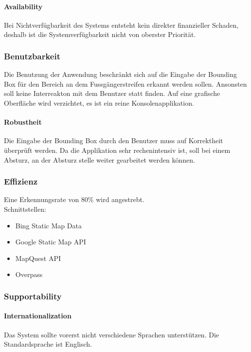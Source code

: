 \paragraph{Availability}
Bei Nichtverfügbarkeit des Systems entsteht kein direkter finanzieller Schaden, deshalb ist die Systemverfügbarkeit nicht von oberster Priorität. 
\subsubsection{Benutzbarkeit}
Die Benutzung der Anwendung beschränkt sich auf die Eingabe der Bounding Box für den Bereich an dem Fussgängerstreifen erkannt werden sollen. Ansonsten soll keine Interreakton mit dem Benutzer statt finden. Auf eine grafische Oberfläche wird verzichtet, es ist ein reine Konsolenapplikation.

\paragraph{Robustheit}
Die Eingabe der Bounding Box durch den Benutzer muss auf Korrektheit überprüft werden. Da die Applikation sehr rechenintensiv ist, soll bei einem Absturz, an der Absturz stelle weiter gearbeitet werden können.
\subsubsection{Effizienz}
Eine Erkennungsrate von 80\% wird angestrebt.\\
Schnittstellen:
\begin{itemize}
	\item Bing Static Map Data
	\item Google Static Map API
	\item MapQuest API
	\item Overpass
\end{itemize}

\subsubsection{Supportability}
\paragraph{Internationalization}
Das System sollte vorerst nicht verschiedene Sprachen unterstützen. 
Die Standardsprache ist Englisch.


